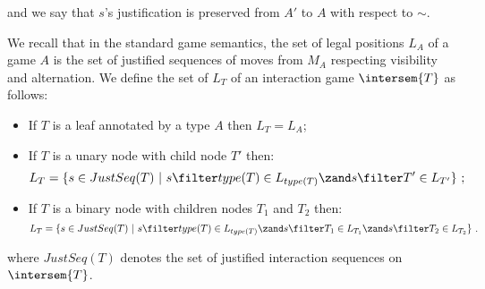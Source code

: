 and we say that $s$'s justification is preserved from $A'$ to $A$
with respect to $\sim$.



\begin{definition} We recall
that in the standard game semantics, the set of legal positions
$L_A$ of a game $A$ is the set of justified sequences of moves from
$M_A$ respecting visibility and alternation. We define the set of
 $L_T$ of an interaction game $\intersem{T}$ as
follows:
    \begin{itemize}
    \item If $T$ is a leaf annotated by a type $A$ then $L_T =
    L_A$;
    \item If $T$ is a unary node with child node $T'$ then:
    $$L_T = \{ s \in JustSeq(T) \ | \ s \filter type(T) \in L_{type(T)} \zand  s \filter T' \in L_{T'} \} \ ;$$
    \item If $T$ is a binary node with children nodes $T_1$ and $T_2$ then:
    $$L_T = \{ s \in JustSeq(T) \ | \ s \filter type(T) \in L_{type(T)} \zand  s \filter T_1 \in L_{T_1}
    \zand  s \filter T_2 \in L_{T_2} \} \ .$$
    \end{itemize}
    where $JustSeq(T)$ denotes the set of justified interaction sequences on
    $\intersem{T}$.
\end{definition}

